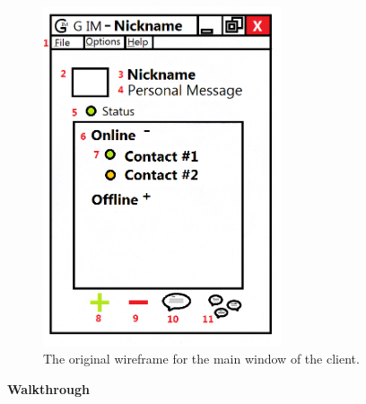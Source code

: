 \begin{figure}
    \begin{center}
        \includegraphics[width=7cm]{Design/diagrams/Main_UI.png}
        \caption{The original wireframe for the main window of the client.}
        \label{mainui}
    \end{center}
\end{figure}

{\bf Walkthrough}

